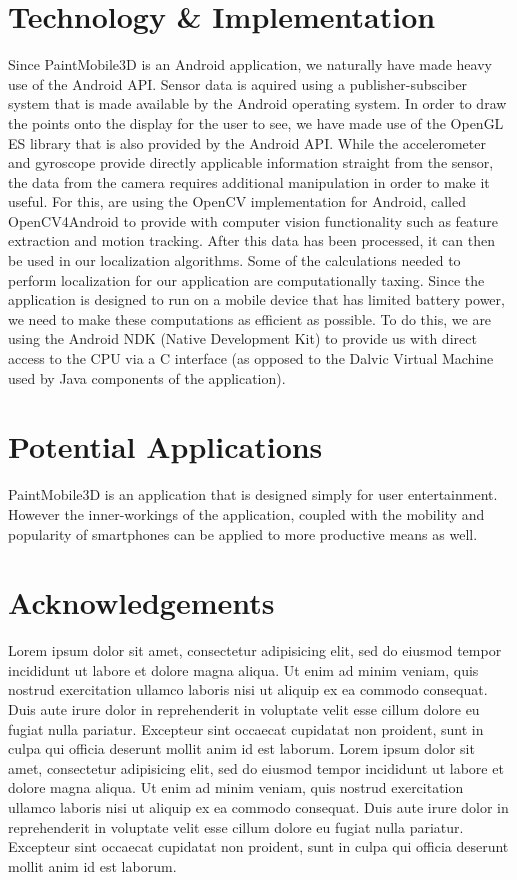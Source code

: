 \documentclass{chi-ext}
\begin{document}
\section{Technology \& Implementation}

Since PaintMobile3D is an Android application, we naturally have made heavy use of the Android API. Sensor data is aquired using a publisher-subsciber system that is made available by the Android operating system. In order to draw the points onto the display for the user to see, we have made use of the OpenGL ES library that is also provided by the Android API. While the accelerometer and gyroscope provide directly applicable information straight from the sensor, the data from the camera requires additional manipulation in order to make it useful. For this, are using the OpenCV implementation for Android, called OpenCV4Android to provide with computer vision functionality such as feature extraction and motion tracking. After this data has been processed, it can then be used in our localization algorithms. Some of the calculations needed to perform localization for our application are computationally taxing. Since the application is designed to run on a mobile device that has limited battery power, we need to make these computations as efficient as possible. To do this, we are using the Android NDK (Native Development Kit) to provide us with direct access to the CPU via a C interface (as opposed to the Dalvic Virtual Machine used by Java components of the application).

\section{Potential Applications}

PaintMobile3D is an application that is designed simply for user entertainment. However the inner-workings of the application, coupled with the mobility and popularity of smartphones can be applied to more productive means as well.


\section{Acknowledgements}

Lorem ipsum dolor sit amet, consectetur adipisicing elit, sed do eiusmod tempor incididunt ut labore et dolore magna aliqua. Ut enim ad minim veniam, quis nostrud exercitation ullamco laboris nisi ut aliquip ex ea commodo consequat. Duis aute irure dolor in reprehenderit in voluptate velit esse cillum dolore eu fugiat nulla pariatur. Excepteur sint occaecat cupidatat non proident, sunt in culpa qui officia deserunt mollit anim id est laborum. Lorem ipsum dolor sit amet, consectetur adipisicing elit, sed do eiusmod tempor incididunt ut labore et dolore magna aliqua. Ut enim ad minim veniam, quis nostrud exercitation ullamco laboris nisi ut aliquip ex ea commodo consequat. Duis aute irure dolor in reprehenderit in voluptate velit esse cillum dolore eu fugiat nulla pariatur. Excepteur sint occaecat cupidatat non proident, sunt in culpa qui officia deserunt mollit anim id est laborum.


\balance



\end{document}
